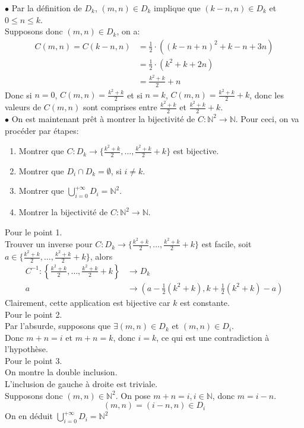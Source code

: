 \documentclass[11pt, a4paper]{article}
\begin{document}
		$\bullet$ Par la définition de $D_k$, $(m,n) \in D_k$ implique que $(k-n,n)\in D_k$ et $0\leq n\leq k$.\\
		Supposons donc $(m,n) \in D_k$, on a:
		\begin{align*}
			C(m,n)=C(k-n,n)&= \frac{1}{2} \cdot \left( (k-n+n)^{2} + k-n + 3n\right)\\
				       &= \frac{1}{2} \cdot \left( k^{2} + k + 2n\right)\\
				       &= \frac{k^{2}+k}{2} + n
		\end{align*}
		Donc si $n=0$, $C(m,n)= \frac{k^{2}+k}{2}$ et si $n=k$, $C(m,n)= \frac{k^{2}+k}{2}+k$, donc les valeurs de $C(m,n)$ sont comprises entre $\frac{k^{2}+k}{2}$ et  $\frac{k^{2}+k}{2}+k$.\\
		$\bullet$ On est maintenant prêt à montrer la bijectivité de $C: \mathbb{N}^{2} \to \mathbb{N}$.
		Pour ceci, on va procéder par étapes:
		\begin{enumerate}
			\item Montrer que $C:D_k \to \{\frac{k^{2}+k}{2},\ldots,\frac{k^{2}+k}{2}+k\}$ est bijective.\\
			\item Montrer que $ D_i \cap D_k= \emptyset$, si $i\neq k$.\\
			\item Montrer que $\bigcup_{i=0}^{+\infty} D_i = \mathbb{N}^{2}$.\\
			\item Montrer la bijectivité de $C: \mathbb{N}^{2} \to \mathbb{N}$.
		\end{enumerate}
		Pour le point 1.\\
		Trouver un inverse pour $C:D_k \to \{\frac{k^{2}+k}{2},\ldots,\frac{k^{2}+k}{2}+k\}$ est facile, soit $a \in \{\frac{k^{2}+k}{2},\ldots,\frac{k^{2}+k}{2}+k\}$, alors
		\begin{align*}
			C^{-1}: \left\{\frac{k^{2}+k}{2},\ldots,\frac{k^{2}+k}{2}+k\right\} &\to D_k\\
			a &\to \left(a-\frac{1}{2}(k^{2}+k),k+\frac{1}{2}(k^{2}+k)-a\right)
		\end{align*}
		Clairement, cette application est bijective car $k$ est constante.\\
		Pour le point 2.\\
		Par l'absurde, supposons que $\exists (m,n) \in D_k$ et $(m,n) \in D_i$.\\
		Donc $m+n=i$ et $m+n=k$, donc $i=k$, ce qui est une contradiction à l'hypothèse.\\
		Pour le point 3.\\
		On montre la double inclusion.\\
		L'inclusion de gauche à droite est triviale.\\
		Supposons donc $(m,n) \in \mathbb{N}^{2}$. On pose $m+n=i, i \in \mathbb{N}$, donc $m=i-n$.
		\[ 
			(m,n) = (i-n,n) \in D_i
		\]
		On en déduit $\bigcup_{i=0}^{+\infty} D_i = \mathbb{N}^{2}$
		

		



		
		
		
\end{document}
